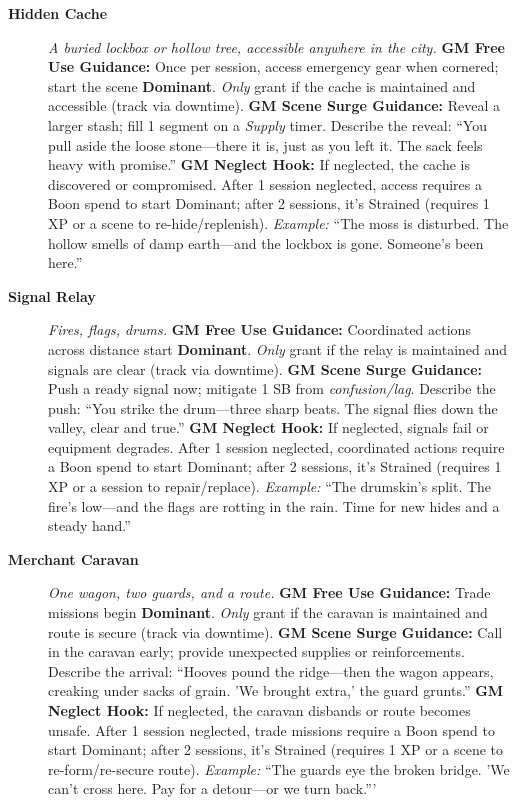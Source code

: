 \begin{description}
  \item[\textbf{Hidden Cache}]   
        \emph{A buried lockbox or hollow tree, accessible anywhere in the city.}  
        \textbf{GM Free Use Guidance:} Once per session, access emergency gear when cornered; start the scene \textbf{Dominant}. \emph{Only} grant if the cache is maintained and accessible (track via downtime).  
        \textbf{GM Scene Surge Guidance:} Reveal a larger stash; fill 1 segment on a \emph{Supply} timer. Describe the reveal: ``You pull aside the loose stone---there it is, just as you left it. The sack feels heavy with promise.''  
        \textbf{GM Neglect Hook:} If neglected, the cache is discovered or compromised. After 1 session neglected, access requires a Boon spend to start Dominant; after 2 sessions, it's Strained (requires 1 XP or a scene to re-hide/replenish).  
        \textit{Example:} ``The moss is disturbed. The hollow smells of damp earth---and the lockbox is gone. Someone's been here.''  

  \item[\textbf{Signal Relay}]   
        \emph{Fires, flags, drums.}  
        \textbf{GM Free Use Guidance:} Coordinated actions across distance start \textbf{Dominant}. \emph{Only} grant if the relay is maintained and signals are clear (track via downtime).  
        \textbf{GM Scene Surge Guidance:} Push a ready signal now; mitigate 1 SB from \emph{confusion/lag}. Describe the push: ``You strike the drum---three sharp beats. The signal flies down the valley, clear and true.''  
        \textbf{GM Neglect Hook:} If neglected, signals fail or equipment degrades. After 1 session neglected, coordinated actions require a Boon spend to start Dominant; after 2 sessions, it's Strained (requires 1 XP or a session to repair/replace).  
        \textit{Example:} ``The drumskin's split. The fire's low---and the flags are rotting in the rain. Time for new hides and a steady hand.''  

  \item[\textbf{Merchant Caravan}]   
        \emph{One wagon, two guards, and a route.}  
        \textbf{GM Free Use Guidance:} Trade missions begin \textbf{Dominant}. \emph{Only} grant if the caravan is maintained and route is secure (track via downtime).  
        \textbf{GM Scene Surge Guidance:} Call in the caravan early; provide unexpected supplies or reinforcements. Describe the arrival: ``Hooves pound the ridge---then the wagon appears, creaking under sacks of grain. 'We brought extra,' the guard grunts.''  
        \textbf{GM Neglect Hook:} If neglected, the caravan disbands or route becomes unsafe. After 1 session neglected, trade missions require a Boon spend to start Dominant; after 2 sessions, it's Strained (requires 1 XP or a scene to re-form/re-secure route).  
        \textit{Example:} ``The guards eye the broken bridge. 'We can't cross here. Pay for a detour---or we turn back.'''  


\end{description}
